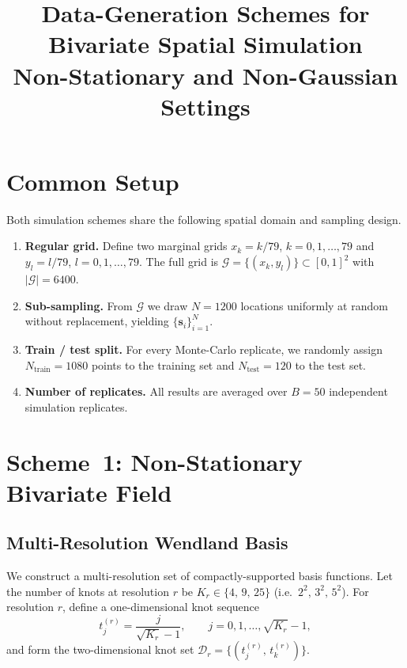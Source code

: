 \documentclass[11pt,a4paper]{article}
\title{\textbf{Data-Generation Schemes for Bivariate Spatial Simulation}\\[4pt]
       \large Non-Stationary and Non-Gaussian Settings}
\author{}
\date{}
\newcommand{\bs}{\bm{s}}
\begin{document}
\maketitle
\thispagestyle{empty}

\section{Common Setup}

Both simulation schemes share the following spatial domain and sampling design.

\begin{enumerate}[leftmargin=*]
  \item \textbf{Regular grid.}
    Define two marginal grids $x_k = k/79$, $k=0,1,\dots,79$ and
    $y_l = l/79$, $l=0,1,\dots,79$.
    The full grid is $\mathcal{G} = \{(x_k,y_l)\} \subset [0,1]^2$ with
    $|\mathcal{G}|=6400$.

  \item \textbf{Sub-sampling.}
    From $\mathcal{G}$ we draw $N=1200$ locations uniformly at random
    without replacement, yielding $\{\bs_i\}_{i=1}^{N}$.

  \item \textbf{Train / test split.}
    For every Monte-Carlo replicate, we randomly assign $N_{\text{train}}=1080$
    points to the training set and $N_{\text{test}}=120$ to the test set.

  \item \textbf{Number of replicates.}
    All results are averaged over $B=50$ independent simulation replicates.
\end{enumerate}

\section{Scheme~1: Non-Stationary Bivariate Field}
\label{sec:ns}

\subsection{Multi-Resolution Wendland Basis}

We construct a multi-resolution set of compactly-supported basis functions.
Let the number of knots at resolution $r$ be
$K_r \in \{4,\,9,\,25\}$ (i.e.\ $2^2,\,3^2,\,5^2$).
For resolution $r$, define a one-dimensional knot sequence
\[
  t_j^{(r)} = \frac{j}{\sqrt{K_r}-1}, \qquad j=0,1,\dots,\sqrt{K_r}-1,
\]
and form the two-dimensional knot set
$\mathcal{D}_r = \{(t_j^{(r)},\,t_k^{(r)})\}$.
\end{document}
